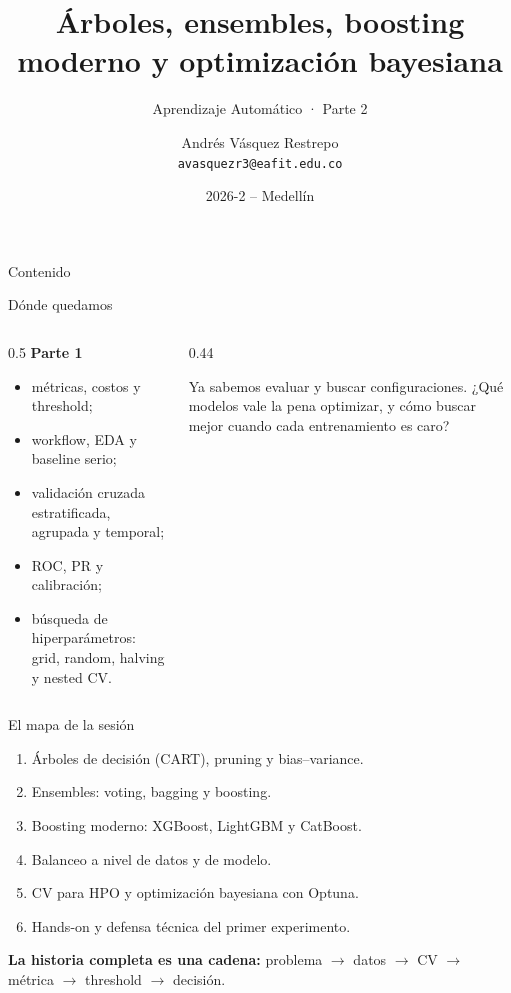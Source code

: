 \documentclass[aspectratio=169,12pt]{beamer}
\title[Árboles, boosting y Optuna]{Árboles, ensembles, boosting moderno y optimización bayesiana}
\subtitle{Aprendizaje Automático · Parte 2}
\author[Aprendizaje Automático]{Andrés Vásquez Restrepo\\[2pt]{\normalfont\small\texttt{avasquezr3@eafit.edu.co}}}
\institute{SI7009 - 1 (5553)\\Universidad EAFIT}
\date{2026-2 -- Medellín}
\newcommand{\colhead}[1]{\textbf{#1}\par\vspace{2pt}}
\begin{document}
\titleframe
\addtocounter{framenumber}{1}

\begin{frame}{Contenido}
  \tableofcontents
\end{frame}

\begin{frame}{Dónde quedamos}
  \begin{columns}[T]
    \begin{column}{0.5\textwidth}
      \colhead{Parte 1}
      \small
      \begin{itemize}
        \item métricas, costos y threshold;
        \item workflow, EDA y baseline serio;
        \item validación cruzada estratificada, agrupada y temporal;
        \item ROC, PR y calibración;
        \item búsqueda de hiperparámetros: grid, random, halving y nested CV.
      \end{itemize}
    \end{column}
    \begin{column}{0.44\textwidth}
      \begin{keybox}
        Ya sabemos evaluar y buscar configuraciones. ¿Qué modelos vale la pena optimizar, y cómo buscar mejor cuando cada entrenamiento es caro?
      \end{keybox}
    \end{column}
  \end{columns}
\end{frame}

\begin{frame}{El mapa de la sesión}
  \small
  \begin{enumerate}
    \item Árboles de decisión (CART), pruning y bias--variance.
    \item Ensembles: voting, bagging y boosting.
    \item Boosting moderno: XGBoost, LightGBM y CatBoost.
    \item Balanceo a nivel de datos y de modelo.
    \item CV para HPO y optimización bayesiana con Optuna.
    \item Hands-on y defensa técnica del primer experimento.
  \end{enumerate}
  \vspace{8pt}
  \begin{center}
    \Large\textbf{La historia completa es una cadena:} problema $\rightarrow$ datos $\rightarrow$ CV $\rightarrow$ métrica $\rightarrow$ threshold $\rightarrow$ decisión.
  \end{center}
\end{frame}
\end{document}

